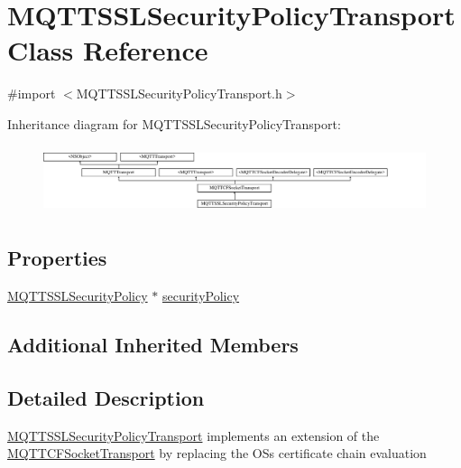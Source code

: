 \hypertarget{interface_m_q_t_t_s_s_l_security_policy_transport}{}\section{M\+Q\+T\+T\+S\+S\+L\+Security\+Policy\+Transport Class Reference}
\label{interface_m_q_t_t_s_s_l_security_policy_transport}


{\ttfamily \#import $<$M\+Q\+T\+T\+S\+S\+L\+Security\+Policy\+Transport.\+h$>$}

Inheritance diagram for M\+Q\+T\+T\+S\+S\+L\+Security\+Policy\+Transport\+:\begin{figure}[H]
\begin{center}
\leavevmode
\includegraphics[height=2.008969cm]{interface_m_q_t_t_s_s_l_security_policy_transport}
\end{center}
\end{figure}
\subsection*{Properties}
\begin{DoxyCompactItemize}
\item 
\hyperlink{interface_m_q_t_t_s_s_l_security_policy}{M\+Q\+T\+T\+S\+S\+L\+Security\+Policy} $\ast$ \hyperlink{interface_m_q_t_t_s_s_l_security_policy_transport_aad852e4a64b0134fd25c077733a6cd55}{security\+Policy}
\end{DoxyCompactItemize}
\subsection*{Additional Inherited Members}


\subsection{Detailed Description}
\hyperlink{interface_m_q_t_t_s_s_l_security_policy_transport}{M\+Q\+T\+T\+S\+S\+L\+Security\+Policy\+Transport} implements an extension of the \hyperlink{interface_m_q_t_t_c_f_socket_transport}{M\+Q\+T\+T\+C\+F\+Socket\+Transport} by replacing the OS\textquotesingle{}s certificate chain evaluation 

